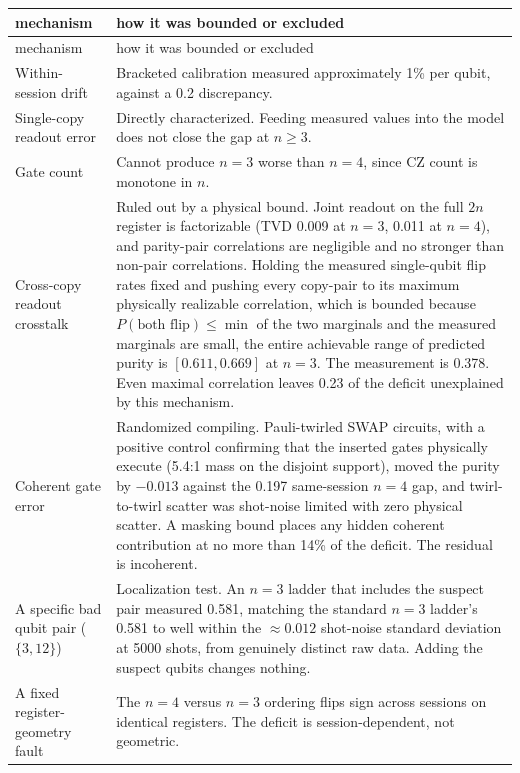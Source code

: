 \begin{longtable}[c]{@{}
  >{\raggedright\arraybackslash}p{}
  >{\raggedright\arraybackslash}p{}@{}}
\toprule
mechanism & how it was bounded or excluded \\
\midrule
\endfirsthead
\toprule
mechanism & how it was bounded or excluded \\
\midrule
\endhead
Within-session drift & Bracketed calibration measured approximately 1\%
per qubit, against a 0.2 discrepancy. \\
Single-copy readout error & Directly characterized. Feeding measured
values into the model does not close the gap at \(n \geq 3\). \\
Gate count & Cannot produce \(n=3\) worse than \(n=4\), since CZ count
is monotone in \(n\). \\
Cross-copy readout crosstalk & Ruled out by a physical bound. Joint
readout on the full \(2n\) register is factorizable (TVD 0.009 at
\(n=3\), 0.011 at \(n=4\)), and parity-pair correlations are negligible
and no stronger than non-pair correlations. Holding the measured
single-qubit flip rates fixed and pushing every copy-pair to its maximum
physically realizable correlation, which is bounded because
\(P(\text{both flip}) \leq \min\) of the two marginals and the measured
marginals are small, the entire achievable range of predicted purity is
\([0.611, 0.669]\) at \(n = 3\). The measurement is 0.378. Even maximal correlation leaves 0.23 of the deficit unexplained by this mechanism. \\
Coherent gate error & Randomized compiling. Pauli-twirled SWAP circuits,
with a positive control confirming that the inserted gates physically
execute (5.4:1 mass on the disjoint support), moved the purity by
\(-0.013\) against the 0.197 same-session \(n = 4\) gap, and twirl-to-twirl scatter was
shot-noise limited with zero physical scatter. A masking bound places
any hidden coherent contribution at no more than 14\% of the deficit.
The residual is incoherent. \\
A specific bad qubit pair (\(\{3, 12\}\)) & Localization test. An
\(n=3\) ladder that includes the suspect pair measured 0.581, matching
the standard \(n=3\) ladder's 0.581 to well within the \(\approx 0.012\)
shot-noise standard deviation at 5000 shots, from genuinely distinct raw
data. Adding the suspect qubits changes nothing. \\
A fixed register-geometry fault & The \(n=4\) versus \(n=3\) ordering
flips sign across sessions on identical registers. The deficit is
session-dependent, not geometric. \\
\bottomrule
\end{longtable}

